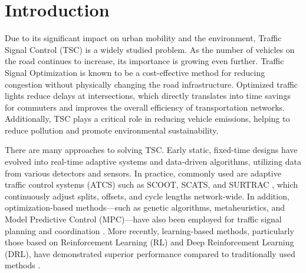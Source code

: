 \chapter*{Introduction}

%
%
%
%

Due to its significant impact on urban mobility and the environment, Traffic Signal Control (TSC) is a widely studied problem. As the number of vehicles on the road continues to increase, its importance is growing even further.
Traffic Signal Optimization is known to be a cost-effective method for reducing congestion without physically changing the road infrastructure.
Optimized traffic lights reduce delays at intersections, which directly translates into time savings for commuters and improves the overall efficiency of transportation networks.
Additionally, TSC plays a critical role in reducing vehicle emissions, helping to reduce pollution and promote environmental sustainability.

There are many approaches \cite{qadri2020state} to solving TSC. Early static, fixed-time designs have evolved into real-time adaptive systems and data-driven algorithms, utilizing data from various detectors and sensors. In practice, commonly used are adaptive traffic control systems (ATCS) such as SCOOT, SCATS, and SURTRAC \cite{smith2013surtrac}, which continuously adjust splits, offsets, and cycle lengths network-wide. In addition, optimization-based methods---such as genetic algorithms, metaheuristics, and Model Predictive Control (MPC)---have also been employed for traffic signal planning and coordination \cite{qadri2020state, ye2019survey}. More recently, learning-based methods, particularly those based on Reinforcement Learning (RL) and Deep Reinforcement Learning (DRL), have demonstrated superior performance compared to traditionally used methods \cite{zhao2024survey, saadi2025survey}.

